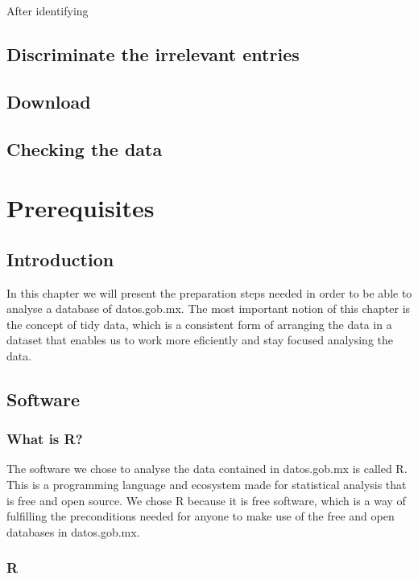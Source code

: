 \documentclass[]{book}
\begin{document}
After identifying

\section{Discriminate the irrelevant
entries}\label{discriminate-the-irrelevant-entries}

\section{Download}\label{download}

\section{Checking the data}\label{checking-the-data}

\chapter{Prerequisites}\label{prerequisites}

\section{Introduction}\label{introduction-2}

In this chapter we will present the preparation steps needed in order to
be able to analyse a database of datos.gob.mx. The most important notion
of this chapter is the concept of tidy data, which is a consistent form
of arranging the data in a dataset that enables us to work more
eficiently and stay focused analysing the data.

\section{Software}\label{software}

\subsection{What is R?}\label{what-is-r}

The software we chose to analyse the data contained in datos.gob.mx is
called R. This is a programming language and ecosystem made for
statistical analysis that is free and open source. We chose R because it
is free software, which is a way of fulfilling the preconditions needed
for anyone to make use of the free and open databases in datos.gob.mx.

\subsection{R}\label{r}
\end{document}
